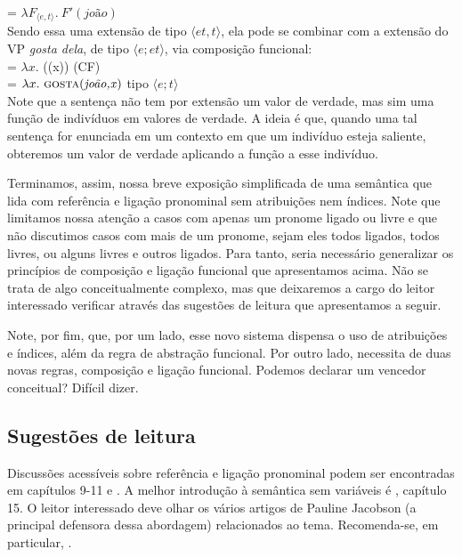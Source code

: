 \n {} = $\lambda F_{\langle e,t\rangle}.\ F'(\textit{joão})$\\

\n Sendo essa uma extensão de tipo $\langle et,t \rangle$, ela pode se combinar com a extensão do VP \textit{gosta dela}, de tipo $\langle e;et \rangle$, via composição funcional:\\

\n {} = $\lambda x.$ ((x)) \hfill (CF)\\

\n {} = $\lambda x.\ \text{\textsc{gosta}(\textit{joão,x})}$  \hfill tipo $\langle e;t \rangle$\\ 

\n Note que a sentença não tem por extensão um valor de verdade, mas sim uma função de indivíduos em valores de verdade. A ideia é que, quando uma tal sentença for enunciada em um contexto em que um indivíduo esteja saliente, obteremos um valor de verdade aplicando a função a esse indivíduo.

Terminamos, assim, nossa breve exposição simplificada de uma semântica que lida com referência e ligação pronominal sem atribuições nem índices. Note que limitamos nossa atenção a casos com apenas um pronome ligado ou livre e que não discutimos casos com mais de um pronome, sejam eles todos ligados, todos livres, ou alguns livres e outros ligados. Para tanto, seria necessário generalizar os princípios de composição e ligação funcional que apresentamos acima. Não se trata de algo conceitualmente complexo, mas que deixaremos a cargo do leitor interessado verificar através das sugestões de leitura que apresentamos a seguir. 

Note, por fim, que, por um lado, esse novo sistema dispensa o uso de atribuições e índices, além da regra de abstração funcional. Por outro lado, necessita de duas novas regras,  composição e ligação funcional. Podemos declarar um vencedor conceitual? Difícil dizer.


\bigskip

\begin{tcolorbox}[parbox=false,boxrule=0pt,sharp corners,breakable]

\section*{Sugestões de leitura}

Discussões acessíveis sobre referência e ligação pronominal podem ser encontradas em \cite{heikra98} capítulos 9-11 e \cite{buring05}. A melhor introdução à semântica sem variáveis é \cite{jacobson14}, capítulo 15. O leitor interessado deve olhar os vários artigos de Pauline Jacobson (a principal defensora dessa abordagem) relacionados ao tema. Recomenda-se, em particular, \cite{jacobson99}.

\end{tcolorbox}

